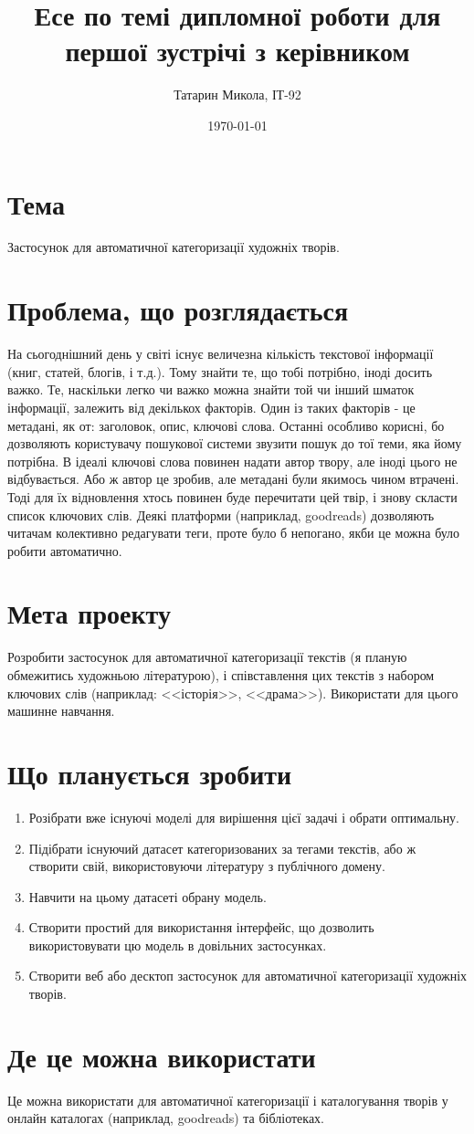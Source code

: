 \documentclass{scrartcl}
\author{Татарин Микола, ІТ-92}
\date{\today}
\title{Есе по темі дипломної роботи для першої зустрічі з керівником}
\begin{document}
\maketitle

\section{Тема}
\label{sec:orgc05631d}
Застосунок для автоматичної категоризації художніх творів.

\section{Проблема, що розглядається}
\label{sec:orgd69c946}
На сьогоднішний день у світі існує величезна кількість текстової інформації (книг, статей, блогів, і т.д.). Тому знайти те, що тобі потрібно, іноді досить важко. Те, наскільки легко чи важко можна знайти той чи інший шматок інформації, залежить від декількох факторів. Один із таких факторів - це метадані, як от: заголовок, опис, ключові слова. Останні особливо корисні, бо дозволяють користувачу пошукової системи звузити пошук до тої теми, яка йому потрібна. В ідеалі ключові слова повинен надати автор твору, але іноді цього не відбувається. Або ж автор це зробив, але метадані були якимось чином втрачені. Тоді для їх відновлення хтось повинен буде перечитати цей твір, і знову скласти список ключових слів. Деякі платформи (наприклад, goodreads) дозволяють читачам колективно редагувати теги, проте було б непогано, якби це можна було робити автоматично.

\section{Мета проекту}
\label{sec:org6bcef2a}
Розробити застосунок для автоматичної категоризації текстів (я планую обмежитись художньою літературою), і співставлення цих текстів з набором ключових слів (наприклад: {}<<історія>>{}, {}<<драма>>{}). Використати для цього машинне навчання.

\section{Що планується зробити}
\label{sec:orgc6da442}
\begin{enumerate}
\item Розібрати вже існуючі моделі для вирішення цієї задачі і обрати оптимальну.
\item Підібрати існуючий датасет категоризованих за тегами текстів, або ж створити свій, використовуючи літературу з публічного домену.
\item Навчити на цьому датасеті обрану модель.
\item Створити простий для використання інтерфейс, що дозволить використовувати цю модель в довільних застосунках.
\item Створити веб або десктоп застосунок для автоматичної категоризації художніх творів.
\end{enumerate}

\section{Де це можна використати}
\label{sec:org90f31e1}
Це можна використати для автоматичної категоризації і каталогування творів у онлайн каталогах (наприклад, goodreads) та бібліотеках.
\end{document}
